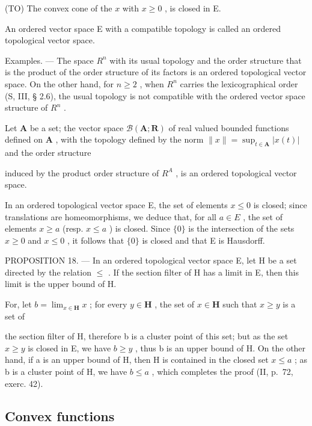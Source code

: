 (TO) The convex cone of the \(x\) with \(x \geqslant 0\) , is closed in E.

An ordered vector space E with a compatible topology is called an ordered topological vector space.

Examples. --- The space \(R^{n}\) with its usual topology and the order structure that is the product of the order structure of its factors is an ordered topological vector space. On the other hand, for \(n \geqslant 2\) , when \(R^{n}\) carries the lexicographical order (S, III, § 2.6), the usual topology is not compatible with the ordered vector space structure of \(R^{n}\) .

Let \(\mathbf{A}\) be a set; the vector space \(\mathcal{B}(\mathbf{A};\mathbf{R})\) of real valued bounded functions defined on \(\mathbf{A}\) , with the topology defined by the norm \(\| x\| = \sup_{t\in \mathbf{A}}|x(t)|\) and the order structure

induced by the product order structure of \(R^{A}\) , is an ordered topological vector space.

In an ordered topological vector space E, the set of elements \(x \leqslant 0\) is closed; since translations are homeomorphisms, we deduce that, for all \(a \in E\) , the set of elements \(x \geqslant a\) (resp. \(x \leqslant a\) ) is closed. Since \(\{0\}\) is the intersection of the sets \(x \geqslant 0\) and \(x \leqslant 0\) , it follows that \(\{0\}\) is closed and that E is Hausdorff.

PROPOSITION 18. --- In an ordered topological vector space E, let H be a set directed by the relation \(\leqslant\) . If the section filter of H has a limit in E, then this limit is the upper bound of H.

For, let \(b = \lim_{x\in \mathbf{H}}x\) ; for every \(y\in \mathbf{H}\) , the set of \(x\in \mathbf{H}\) such that \(x\geqslant y\) is a set of

the section filter of H, therefore b is a cluster point of this set; but as the set \(x \geqslant y\) is closed in E, we have \(b \geqslant y\) , thus b is an upper bound of H. On the other hand, if a is an upper bound of H, then H is contained in the closed set \(x \leqslant a\) ; as b is a cluster point of H, we have \(b \leqslant a\) , which completes the proof (II, p.~72, exerc. 42).

\subsection{Convex functions}

